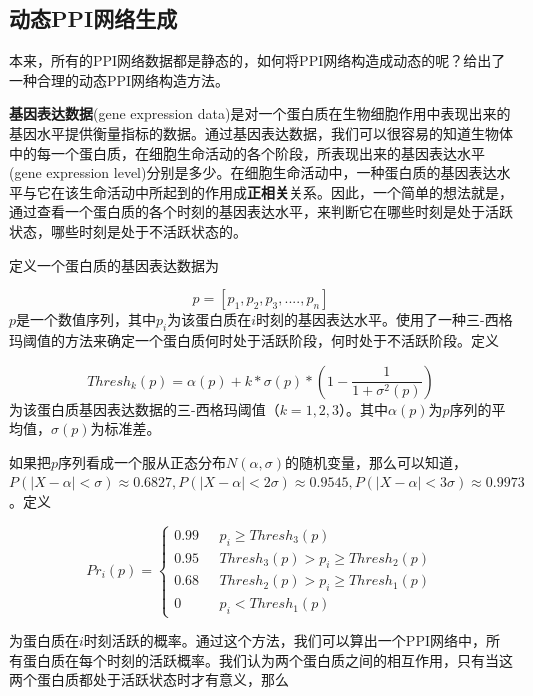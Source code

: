 \subsection{动态PPI网络生成}
本来，所有的PPI网络数据都是静态的，如何将PPI网络构造成动态的呢？\cite{zhang2016method}给出了一种合理的动态PPI网络构造方法。

\textbf{基因表达数据}(gene expression data)是对一个蛋白质在生物细胞作用中表现出来的基因水平提供衡量指标的数据。通过基因表达数据，我们可以很容易的知道生物体中的每一个蛋白质，在细胞生命活动的各个阶段，所表现出来的基因表达水平(gene expression level)分别是多少。在细胞生命活动中，一种蛋白质的基因表达水平与它在该生命活动中所起到的作用成\textbf{正相关}关系。因此，一个简单的想法就是，通过查看一个蛋白质的各个时刻的基因表达水平，来判断它在哪些时刻是处于活跃状态，哪些时刻是处于不活跃状态的。

定义一个蛋白质的基因表达数据为

\begin{equation}\label{dppi1}
p=[ p_1,p_2,p_3,....,p_n]
\end{equation}
$p$是一个数值序列，其中$p_i$为该蛋白质在$i$时刻的基因表达水平。\cite{zhang2016method}使用了一种三-西格玛阈值的方法来确定一个蛋白质何时处于活跃阶段，何时处于不活跃阶段。定义

\begin{equation}\label{dppi2}
Thresh_k(p)=\alpha (p)+k*\sigma (p)*\left (1-\frac{1}{1+\sigma ^2(p)}\right )
\end{equation}
为该蛋白质基因表达数据的三-西格玛阈值（$k=1,2,3$）。其中$\alpha (p)$为$p$序列的平均值，$\sigma (p)$为标准差。

如果把$p$序列看成一个服从正态分布$N(\alpha,\sigma)$的随机变量，那么可以知道，$P(|X-\alpha|<\sigma)\approx 0.6827,P(|X-\alpha|<2\sigma)\approx 0.9545,P(|X-\alpha|<3\sigma)\approx 0.9973$。定义

\begin{equation}\label{dppi3}
Pr_i(p)= \begin{cases}
0.99 & \text{  } p_i\geq Thresh_3(p)\\ 
0.95 & \text{  } Thresh_3(p)> p_i\geq Thresh_2(p) \\ 
0.68 & \text{  } Thresh_2(p)> p_i\geq Thresh_1(p) \\ 
0 & \text{  } p_i<Thresh_1(p) 
\end{cases}
\end{equation}


为蛋白质在$i$时刻活跃的概率。通过这个方法，我们可以算出一个PPI网络中，所有蛋白质在每个时刻的活跃概率。我们认为两个蛋白质之间的相互作用，只有当这两个蛋白质都处于活跃状态时才有意义，那么

